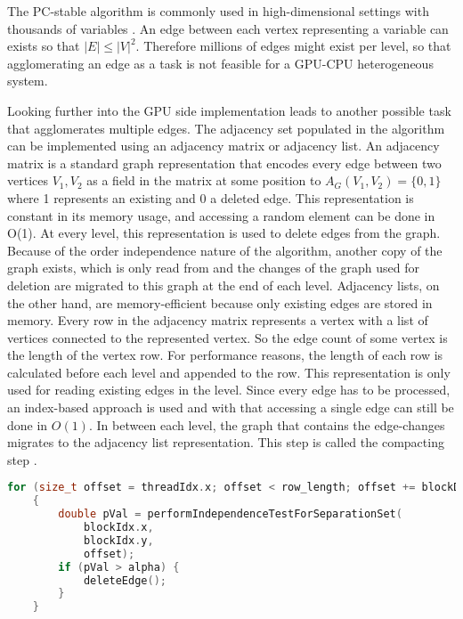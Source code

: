 The PC-stable algorithm is commonly used in high-dimensional settings with thousands of variables \cite{nagarajanFunctionalRelationshipsGenes2010}. An edge between each vertex representing a variable can exists so that $|E| \leq |V|^{2}$. Therefore millions of edges might exist per level, so that agglomerating an edge as a task is not feasible for a GPU-CPU heterogeneous system.

Looking further into the GPU side implementation leads to another possible task that agglomerates multiple edges. The adjacency set populated in the algorithm can be implemented using an adjacency matrix or adjacency list. An adjacency matrix is a standard graph representation that encodes every edge between two vertices $V_1, V_2$ as a field in the matrix at some position to $A_G(V_1, V_2) = \{0,1\}$ where 1 represents an existing and 0 a deleted edge. This representation is constant in its memory usage, and accessing a random element can be done in O(1). At every level, this representation is used to delete edges from the graph. Because of the order independence nature of the algorithm, another copy of the graph exists, which is only read from and the changes of the graph used for deletion are migrated to this graph at the end of each level.
Adjacency lists, on the other hand, are memory-efficient because only existing edges are stored in memory. Every row in the adjacency matrix represents a vertex with a list of vertices connected to the represented vertex. So the edge count of some vertex is the length of the vertex row. For performance reasons, the length of each row is calculated before each level and appended to the row. This representation is only used for reading existing edges in the level. Since every edge has to be processed, an index-based approach is used and with that accessing a single edge can still be done in $O(1)$.
In between each level, the graph that contains the edge-changes migrates to the adjacency list representation. This step is called the compacting step \cite{zarebavaniCuPCCUDAbasedParallel2018}.

\begin{lstlisting}[language=C++, caption=Basic separation set loop in level 1, label=lst:sepsetloopl1]
    for (size_t offset = threadIdx.x; offset < row_length; offset += blockDim.x)
    {
        double pVal = performIndependenceTestForSeparationSet(
            blockIdx.x,
            blockIdx.y,
            offset);
        if (pVal > alpha) {
            deleteEdge();
        }
    }
\end{lstlisting}

